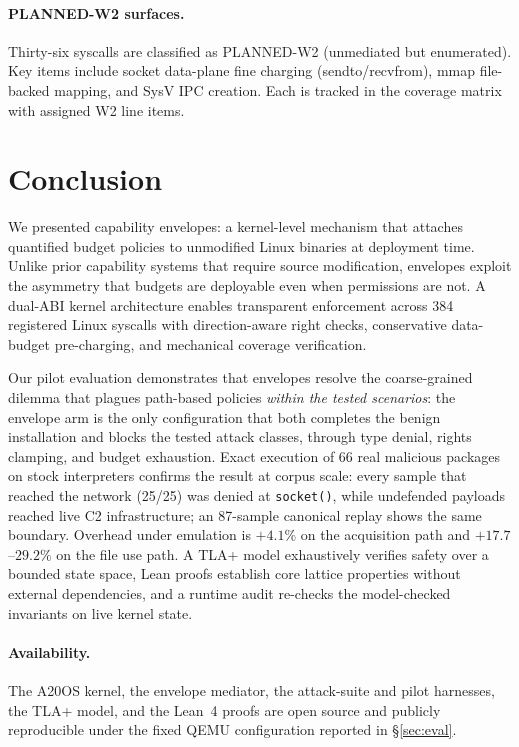 \documentclass[letterpaper,twocolumn,10pt]{article}
\begin{document}
\paragraph{PLANNED-W2 surfaces.}
Thirty-six syscalls are classified as PLANNED-W2 (unmediated but
enumerated).  Key items include socket data-plane fine charging
(sendto/recvfrom), mmap file-backed mapping, and SysV IPC creation.
Each is tracked in the coverage matrix with assigned W2 line items.

\section{Conclusion}
\label{sec:conclusion}

We presented capability envelopes: a kernel-level mechanism that
attaches quantified budget policies to unmodified Linux binaries at
deployment time.  Unlike prior capability systems that require source
modification, envelopes exploit the asymmetry that budgets are
deployable even when permissions are not.  A dual-ABI kernel
architecture enables transparent enforcement across 384 registered
Linux syscalls with direction-aware right checks, conservative data-budget
pre-charging, and mechanical coverage verification.

Our pilot evaluation demonstrates that envelopes resolve the
coarse-grained dilemma that plagues path-based policies \emph{within
the tested scenarios}: the envelope arm is the only configuration that
both completes the benign installation and blocks the tested attack
classes, through type denial, rights clamping, and budget exhaustion.
Exact execution of 66 real malicious packages on stock interpreters
confirms the result at corpus scale: every sample that reached the
network (25/25) was denied at \texttt{socket()}, while undefended
payloads reached live C2 infrastructure; an 87-sample canonical replay
shows the same boundary.
Overhead under emulation is $+4.1\%$ on the acquisition path and
$+17.7$--$29.2\%$ on the file use path.  A TLA+ model exhaustively
verifies safety over a bounded state space, Lean proofs establish core
lattice properties without external dependencies, and a runtime audit
re-checks the model-checked invariants on live kernel state.

\paragraph{Availability.}
The A20OS kernel, the envelope mediator, the attack-suite and pilot
harnesses, the TLA+ model, and the Lean~4 proofs are open source and
publicly reproducible under the fixed QEMU configuration reported in
\S\ref{sec:eval}.
\end{document}
